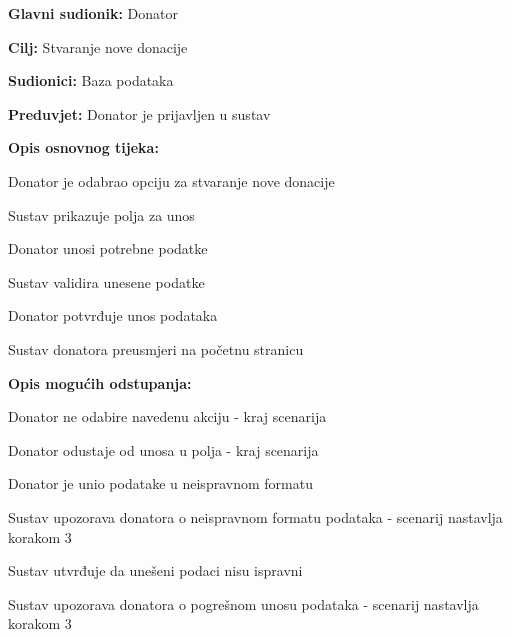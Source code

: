 					\noindent {}
					\begin{packed_item}
	
						\item \textbf{Glavni sudionik: }Donator
						\item  \textbf{Cilj:} Stvaranje nove donacije
						\item  \textbf{Sudionici:} Baza podataka
						\item  \textbf{Preduvjet:} Donator je prijavljen u sustav
						\item  \textbf{Opis osnovnog tijeka:}
						
						\item[] \begin{packed_enum}
							\item Donator je odabrao opciju za stvaranje nove donacije
							\item Sustav prikazuje polja za unos
							\item Donator unosi potrebne podatke
							\item Sustav validira unesene podatke
							\item Donator potvrđuje unos podataka
							\item Sustav donatora preusmjeri na početnu stranicu
						\end{packed_enum}

						\item  \textbf{Opis mogućih odstupanja:}

						\item[] \begin{packed_item}
							\item[1.a] Donator ne odabire navedenu akciju - kraj scenarija
							\item[3.a] Donator odustaje od unosa u polja - kraj scenarija
							\item[4.a] Donator je unio podatake u neispravnom formatu
							\item[] \begin{packed_enum}
								\item Sustav upozorava donatora o neispravnom formatu podataka - scenarij nastavlja korakom 3
							\end{packed_enum}	
							\item[6.a] Sustav utvrđuje da unešeni podaci nisu ispravni
							\item[] \begin{packed_enum}
								\item Sustav upozorava donatora o pogrešnom unosu podataka - scenarij nastavlja korakom 3
							\end{packed_enum}					
						\end{packed_item}
					\end{packed_item}
					
